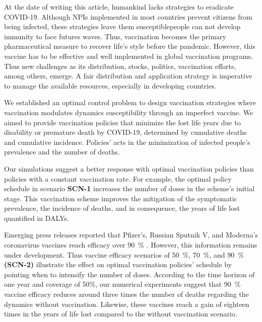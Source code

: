 
At the date of writing this article, humankind lacks strategies to
eradicate COVID-19.  Although NPIs implemented in most countries prevent
citizens from being infected, these strategies leave them
susceptible\textemdash people can not develop immunity to face futures waves.
Thus, vaccination becomes the primary pharmaceutical measure to recover life's
style before the pandemic. However, this vaccine has to be effective and well
implemented in global
vaccination programs. Thus new challenges as its distribution, stocks,
politics, vaccination efforts, among others, emerge. A fair distribution and
application strategy is imperative to manage the available resources,
especially in developing countries.

We established an optimal control problem to design vaccination strategies
where vaccination modulates dynamics susceptibility through an imperfect
vaccine. We aimed to provide vaccination policies that minimize the lost life
years due to disability or premature death by COVID-19, determined by
cumulative deaths and cumulative incidence. Policies' acts in the minimization
of infected people's prevalence and the number of deaths.

Our simulations suggest a better response with optimal vaccination policies
than policies with a constant vaccination rate. For example, the optimal policy
schedule in scenario \textbf{SCN-1} increases the number of doses in the
scheme's initial stage. This vaccination scheme improves the mitigation of the
symptomatic prevalence, the incidence of deaths, and in consequence, the years
of life lost quantified in DALYs.
%

Emerging press releases reported that Pfizer's, Russian Sputnik V,
and Moderna's coronavirus vaccines reach efficacy over \SI{90}{\percent}
\cite{cnn_health_2020,reuters2020, cnn_health_2020b}. However,
this information remains under development. Thus vaccine efficacy scenarios of
\SI{50}{\percent}, \SI{70}{\percent}, and \SI{90}{\percent} \textbf{(SCN-2)}
illustrate the effect on optimal vaccination policies' schedule by pointing
when to intensify the number of doses. According to the time horizon of one
year and coverage of 50\%, our numerical experiments suggest that
\SI{90}{\percent} vaccine efficacy reduces around three times the number of
deaths regarding the dynamics without vaccination. Likewise, these vaccines
reach a gain of eighteen times in the years of life lost compared to the
without vaccination scenario.


